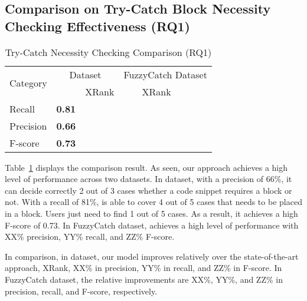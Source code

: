 \subsection{Comparison on Try-Catch Block Necessity Checking Effectiveness (RQ1)}
\label{sec:rq1}

\begin{table}[t]
  \caption{Try-Catch Necessity Checking Comparison (RQ1)}
  \vspace{-12pt}
	\begin{center}
		\renewcommand{\arraystretch}{1}
		\begin{tabular}{p{1.5cm}<{\centering}|p{1.25cm}<{\centering}p{1.25cm}<{\centering}|p{1.25cm}<{\centering}p{1.25cm}<{\centering}}
			\hline
			\multirow{2}{*}{Category} & \multicolumn{2}{c|}{{\tool} Dataset} & \multicolumn{2}{c}{FuzzyCatch Dataset}\\
			\cline{2-5}
			  & \tool  & XRank & \tool  & XRank\\
			\hline
			Recall    & \textbf{0.81} & &&\\
			Precision & \textbf{0.66} & &&\\
			F-score   & \textbf{0.73} & &&\\
			\hline
		\end{tabular}
		\label{tab:xblock}
	\end{center}
\end{table}


Table~\ref{tab:xblock} displays the comparison result. As seen, our
approach achieves a high level of performance across two datasets. In
{\tool} dataset, with a precision of 66\%, it can decide correctly 2
out of 3 cases whether a code snippet requires a 
block or not. With a recall of 81\%, {\tool} is able to cover 4 out of
5 cases that needs to be placed in a  block. Users
just need to find 1 out of 5 cases. As a result, it achieves a high
F-score of 0.73. In FuzzyCatch dataset, {\tool} achieves a high level
of performance with XX\% precision, YY\% recall, and ZZ\% F-score.

In comparison, in {\tool} dataset, our model improves relatively over
the state-of-the-art approach, XRank, XX\% in precision, YY\% in
recall, and ZZ\% in F-score. In FuzzyCatch dataset, the relative
improvements are XX\%, YY\%, and ZZ\% in precision, recall, and
F-score, respectively.

